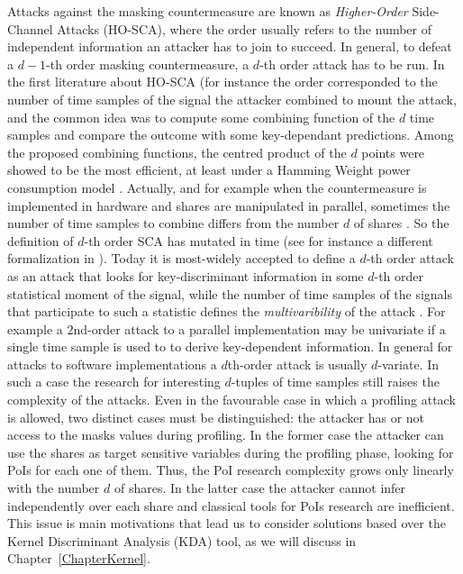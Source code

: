 Attacks against the masking countermeasure are known as \emph{Higher-Order} Side-Channel Attacks (HO-SCA), where the order usually refers to the number of independent information an attacker has to join to succeed. In general, to defeat a $d-1$-th order masking countermeasure, a $d$-th order attack has to be run. In the first literature about HO-SCA (for instance \cite{messerges2000using,Waddle2004,joye2005second,oswald2006practical} the order corresponded to the number of time samples of the signal the attacker combined to mount the attack, and the common idea was to compute some combining function of the $d$ time samples and compare the outcome with some key-dependant predictions. Among the proposed combining functions, the centred product of the $d$ points were showed to be the most efficient, at least under a Hamming Weight power consumption model \cite{DBLP:journals/tc/ProuffRB09}. Actually, and for example when the countermeasure is implemented in hardware and shares are manipulated in parallel, sometimes the number of time samples to combine differs from the number $d$ of shares \cite{peeters2005improved,standaert2005masking}. So the definition of $d$-th order SCA has mutated in time (see for instance a different formalization in \cite{piret2008security}). Today it is most-widely accepted to define a $d$-th order attack as an attack that looks for key-discriminant information in some $d$-th order statistical moment of the signal, while the number of time samples of the signals that participate to such a statistic defines the \emph{multivaribility} of the attack \cite{gierlichs2010revisiting,batina2011mutual,carlet2014achieving}. For example a $2$nd-order attack to a parallel implementation may be univariate if a single time sample is used to to derive key-dependent information. In general for attacks to software implementations a $d$th-order attack is usually $d$-variate. In such a case the research for interesting $d$-tuples of time samples still raises the complexity of the attacks. Even in the favourable case in which a profiling attack is allowed, two distinct cases must be distinguished: the attacker has or not access to the masks values during profiling. In the former case the attacker can use the shares as target sensitive variables during the profiling phase, looking for PoIs for each one of them. Thus, the PoI research complexity grows only linearly with the number $d$ of shares. In the latter case the attacker cannot infer independently over each share and classical tools for PoIs research are inefficient. This issue is main motivations that lead us to consider solutions based over the Kernel Discriminant Analysis (KDA) tool, as we will discuss in Chapter~\ref{ChapterKernel}.

